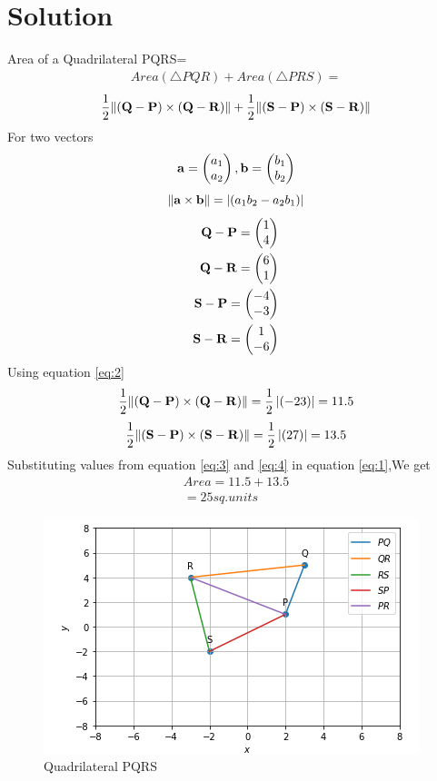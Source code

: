 \documentclass[journal,12pt,twocolumn]{IEEEtran}
\begin{document}
\section*{\textbf{Solution}}
\noindent
Area of a Quadrilateral PQRS=
\begin{align}
Area (\triangle PQR)+ Area (\triangle PRS)=
\end{align}
\begin{equation}
\frac{1}{2}\lVert(\mathbf{Q}-\mathbf{P})\times(\mathbf{Q}-\mathbf{R})\rVert+\frac{1}{2}\lVert\mathbf{(\mathbf{S}-\mathbf{P})\times(\mathbf{S}-\mathbf{R})}\rVert
\label{eq:1}
\end{equation}
For two vectors
\begin{align}
\mathbf{a}=\begin{pmatrix}a_1\\a_2\end{pmatrix} , \mathbf{b}=\begin{pmatrix}b_1\\b_2\end{pmatrix}
\end{align}
\begin{equation}
\lVert\mathbf{\mathbf{a}\times\mathbf{b}}\rVert=\left\lvert(a_1b_2-a_2b_1)\right\rvert
\label{eq:2}
\end{equation}
\begin{align}
\mathbf{Q-P}=\begin{pmatrix}1\\4\end{pmatrix}\\
\mathbf{Q-R}=\begin{pmatrix}6\\1\end{pmatrix}\\
\mathbf{S-P}=\begin{pmatrix}-4\\-3\end{pmatrix}\\
\mathbf{S-R}=\begin{pmatrix}1\\-6\end{pmatrix}
\end{align}
Using equation \eqref{eq:2}
\begin{equation}
\frac{1}{2}\lVert\mathbf{(\mathbf{Q}-\mathbf{P})\times(\mathbf{Q}-\mathbf{R})}\rVert
=\frac{1}{2}\left\lvert(-23)\right\rvert=11.5
\label{eq:3}
\end{equation}
\begin{equation}
\frac{1}{2}\lVert\mathbf{(\mathbf{S}-\mathbf{P})\times(\mathbf{S}-\mathbf{R})}\rVert
=\frac{1}{2}\left\lvert(27)\right\rvert=13.5    
\label{eq:4}
\end{equation}
Substituting values from equation \eqref{eq:3} and \eqref{eq:4} in equation \eqref{eq:1},We get
\begin{align}
Area =11.5+13.5\\
=25 sq.units
\end{align}
\begin{figure}[!ht]
    \centering
    \includegraphics[width=\columnwidth]{QUAD.PNG}
    \caption{Quadrilateral PQRS}
    \label{fig:Quad PQRS}
\end{figure}
\end{document}
